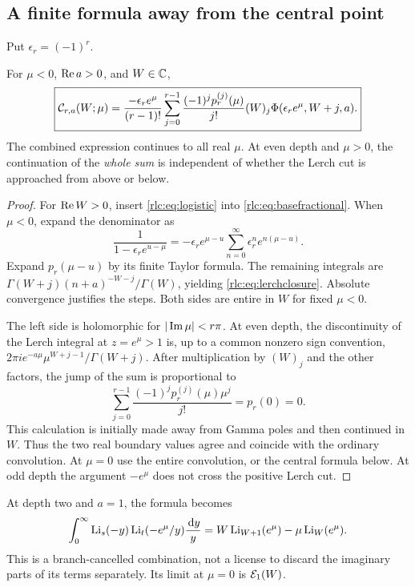 \subsection{A finite formula away from the central point}
Put $\epsilon_r=(-1)^r$.
\begin{theorem}\label{rlc:thm:lerch}
For $\mu<0$, $\operatorname{Re} a>0$, and $W\in\mathbb C$,
\begin{equation}\label{rlc:eq:lerchclosure}
 \boxed{\displaystyle
 \mathcal C_{r,a}(W;\mu)=
 \frac{-\epsilon_r e^\mu}{(r-1)!}
 \sum_{j=0}^{r-1}\frac{(-1)^j p_r^{(j)}(\mu)}{j!}
 (W)_j\Phi(\epsilon_r e^\mu,W+j,a).}
\end{equation}
The combined expression continues to all real $\mu$. At even depth and
$\mu>0$, the continuation of the \emph{whole sum} is independent of
whether the Lerch cut is approached from above or below.
\end{theorem}
\begin{proof}
For $\operatorname{Re} W>0$, insert \eqref{rlc:eq:logistic} into
\eqref{rlc:eq:basefractional}. When $\mu<0$, expand the denominator as
\[
 \frac1{1-\epsilon_r e^{u-\mu}}
 =-\epsilon_r e^{\mu-u}
       \sum_{n=0}^\infty\epsilon_r^n e^{n(\mu-u)}.
\]
Expand $p_r(\mu-u)$ by its finite Taylor formula. The remaining
integrals are
$\Gamma(W+j)(n+a)^{-W-j}/\Gamma(W)$, yielding
\eqref{rlc:eq:lerchclosure}. Absolute convergence justifies the steps.
Both sides are entire in $W$ for fixed $\mu<0$.

The left side is holomorphic for $|\operatorname{Im}\mu|<r\pi$. At even depth,
the discontinuity of the Lerch integral at $z=e^\mu>1$ is, up to a
common nonzero sign convention,
$2\pi i e^{-a\mu}\mu^{W+j-1}/\Gamma(W+j)$.
After multiplication by $(W)_j$ and the other factors, the jump of the
sum is proportional to
\[
 \sum_{j=0}^{r-1}\frac{(-1)^j p_r^{(j)}(\mu)\mu^j}{j!}
 =p_r(0)=0.
\]
This calculation is initially made away from Gamma poles and then
continued in $W$. Thus the two real boundary values agree and coincide
with the ordinary convolution. At $\mu=0$ use the entire convolution,
or the central formula below. At odd depth the argument
$-e^\mu$ does not cross the positive Lerch cut.
\end{proof}

At depth two and $a=1$, the formula becomes
\begin{equation}\label{rlc:eq:fugacity2}
 \int_0^\infty\operatorname{Li}_s(-y)\operatorname{Li}_t(-e^\mu/y)\frac{\,\mathrm d y}{y}
 =W\operatorname{Li}_{W+1}(e^\mu)-\mu\operatorname{Li}_W(e^\mu).
\end{equation}
This is a branch-cancelled combination, not a license to discard the
imaginary parts of its terms separately. Its limit at $\mu=0$ is
$\mathcal E_1(W)$.

